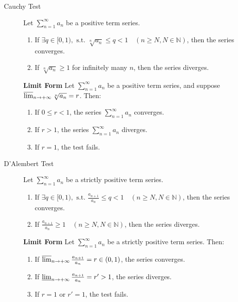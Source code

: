 \documentclass[11pt]{../../TexTemplate/elegantbook}
\begin{document}
\begin{theorem}
\begin{description}
    \item[Cauchy Test] Let \( \sum_{n=1}^{\infty} a_n \) be a positive term series.
        \begin{enumerate}
            \item If \( \exists q \in [0,1), \text{ s.t. } \sqrt[n]{a_n} \leqslant 
            q < 1 \quad (n \geqslant N, N \in \mathbb{N}) \), then the series converges.
            \item If \( \sqrt[n]{a_n} \geqslant 1 \) for infinitely many \( n \), then the series diverges.
        \end{enumerate}
        \textbf{Limit Form} Let \( \sum_{n=1}^{\infty} a_n \) be a positive term series, 
        and suppose \( \varlimsup_{n \to +\infty} \sqrt[n]{a_n} = r \). Then:
        \begin{enumerate}
            \item If \( 0 \leqslant r < 1 \), the series \( \sum_{n=1}^{\infty} a_n \) converges.
            \item If \( r > 1 \), the series \( \sum_{n=1}^{\infty} a_n \) diverges.
            \item If \( r = 1 \), the test fails.
        \end{enumerate}

    \item[D'Alembert Test] Let \( \sum_{n=1}^{\infty} a_n \) be a strictly positive term series.
        \begin{enumerate}
            \item If \( \exists q \in [0,1), \text{ s.t. } \frac{a_{n+1}}{a_n} \leqslant 
            q < 1 \quad (n \geqslant N, N \in \mathbb{N}) \), then the series converges.
            \item If \( \frac{a_{n+1}}{a_n} \geqslant 1 \quad (n \geqslant N, N \in \mathbb{N}) \), 
            then the series diverges.
        \end{enumerate}
        \textbf{Limit Form}
        Let \( \sum_{n=1}^{\infty} a_n \) be a strictly positive term series. Then:
        \begin{enumerate}
            \item If \( \varlimsup_{n \to +\infty} \frac{a_{n+1}}{a_n} = r \in (0,1) \), the series converges.
            \item If \( \varliminf_{n \to +\infty} \frac{a_{n+1}}{a_n} = r' > 1 \), the series diverges.
            \item If \( r = 1 \) or \( r' = 1 \), the test fails.
        \end{enumerate}
    

\end{description}
\end{theorem}
\end{document}
